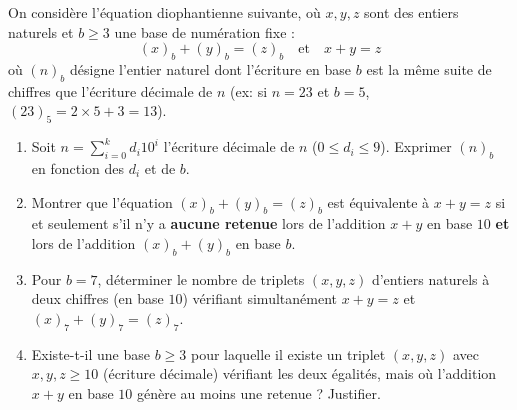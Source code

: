 \documentclass[11pt]{article}
\begin{document}
\begin{exercice}
On considère l'équation diophantienne suivante, où $x, y, z$ sont des entiers naturels et $b \geq 3$ une base de numération fixe :
\[
(x)_b + (y)_b = (z)_b \quad \text{et} \quad x + y = z
\]
où $(n)_b$ désigne l'entier naturel dont l'écriture en base $b$ est la même suite de chiffres que l'écriture décimale de $n$ (ex: si $n=23$ et $b=5$, $(23)_5 = 2\times 5 + 3 = 13$).
\begin{enumerate}
    \item Soit $n = \sum_{i=0}^{k} d_i 10^i$ l'écriture décimale de $n$ ($0 \leq d_i \leq 9$). Exprimer $(n)_b$ en fonction des $d_i$ et de $b$.
    \item Montrer que l'équation $(x)_b + (y)_b = (z)_b$ est équivalente à $x+y=z$ si et seulement s'il n'y a \textbf{aucune retenue} lors de l'addition $x+y$ en base $10$ \textbf{et} lors de l'addition $(x)_b+(y)_b$ en base $b$.
    \item Pour $b=7$, déterminer le nombre de triplets $(x,y,z)$ d'entiers naturels à deux chiffres (en base $10$) vérifiant simultanément $x+y=z$ et $(x)_7+(y)_7=(z)_7$.
    \item Existe-t-il une base $b \geq 3$ pour laquelle il existe un triplet $(x,y,z)$ avec $x,y,z \geq 10$ (écriture décimale) vérifiant les deux égalités, mais où l'addition $x+y$ en base $10$ génère au moins une retenue ? Justifier.
\end{enumerate}
\end{exercice}
\end{document}
